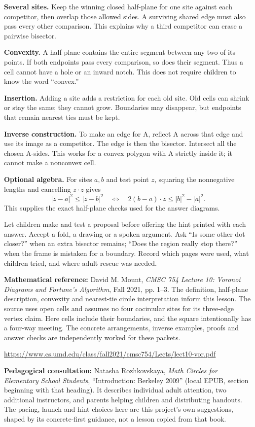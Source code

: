 \documentclass[letterpaper,11pt]{article}
\newcommand{\heading}[1]{\par\vspace{5pt}{\large\bfseries #1}\par}
\begin{document}
\textbf{Several sites.} Keep the winning closed half-plane for one site against each competitor, then overlap those allowed sides. A surviving shared edge must also pass every other comparison. This explains why a third competitor can erase a pairwise bisector.

\textbf{Convexity.} A half-plane contains the entire segment between any two of its points. If both endpoints pass every comparison, so does their segment. Thus a cell cannot have a hole or an inward notch. This does not require children to know the word ``convex.''

\textbf{Insertion.} Adding a site adds a restriction for each old site. Old cells can shrink or stay the same; they cannot grow. Boundaries may disappear, but endpoints that remain nearest ties must be kept.

\textbf{Inverse construction.} To make an edge for A, reflect A across that edge and use its image as a competitor. The edge is then the bisector. Intersect all the chosen A-sides. This works for a convex polygon with A strictly inside it; it cannot make a nonconvex cell.

\textbf{Optional algebra.} For sites $a,b$ and test point $z$, squaring the nonnegative lengths and cancelling $z\cdot z$ gives
\[|z-a|^2\leq|z-b|^2\quad\Longleftrightarrow\quad 2(b-a)\cdot z\leq |b|^2-|a|^2.\]
This supplies the exact half-plane checks used for the answer diagrams.

\heading{Use hints sparingly and observe}
Let children make and test a proposal before offering the hint printed with each answer. Accept a fold, a drawing or a spoken argument. Ask ``Is some other dot closer?'' when an extra bisector remains; ``Does the region really stop there?'' when the frame is mistaken for a boundary. Record which pages were used, what children tried, and where adult rescue was needed.

\heading{Sources and scope of adaptation}
\textbf{Mathematical reference:} David M. Mount, \emph{CMSC 754 Lecture 10: Voronoi Diagrams and Fortune's Algorithm}, Fall 2021, pp. 1--3. The definition, half-plane description, convexity and nearest-tie circle interpretation inform this lesson. The source uses open cells and assumes no four cocircular sites for its three-edge vertex claim. Here cells include their boundaries, and the square intentionally has a four-way meeting. The concrete arrangements, inverse examples, proofs and answer checks are independently worked for these packets.\par
{\small\url{https://www.cs.umd.edu/class/fall2021/cmsc754/Lects/lect10-vor.pdf}}\par
\textbf{Pedagogical consultation:} Natasha Rozhkovskaya, \emph{Math Circles for Elementary School Students}, ``Introduction: Berkeley 2009'' (local EPUB, section beginning with that heading). It describes individual adult attention, two additional instructors, and parents helping children and distributing handouts. The pacing, launch and hint choices here are this project's own suggestions, shaped by its concrete-first guidance, not a lesson copied from that book.
\endgroup
\end{document}
